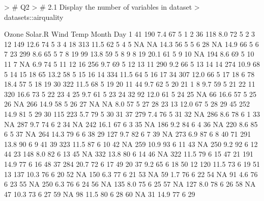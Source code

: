\documentclass{article}
\begin{document}
\begin{Schunk}
\begin{Sinput}
> # Q2
> # 2.1 Display the number of variables in dataset
> datasets::airquality
\end{Sinput}
\begin{Soutput}
    Ozone Solar.R Wind Temp Month Day
1      41     190  7.4   67     5   1
2      36     118  8.0   72     5   2
3      12     149 12.6   74     5   3
4      18     313 11.5   62     5   4
5      NA      NA 14.3   56     5   5
6      28      NA 14.9   66     5   6
7      23     299  8.6   65     5   7
8      19      99 13.8   59     5   8
9       8      19 20.1   61     5   9
10     NA     194  8.6   69     5  10
11      7      NA  6.9   74     5  11
12     16     256  9.7   69     5  12
13     11     290  9.2   66     5  13
14     14     274 10.9   68     5  14
15     18      65 13.2   58     5  15
16     14     334 11.5   64     5  16
17     34     307 12.0   66     5  17
18      6      78 18.4   57     5  18
19     30     322 11.5   68     5  19
20     11      44  9.7   62     5  20
21      1       8  9.7   59     5  21
22     11     320 16.6   73     5  22
23      4      25  9.7   61     5  23
24     32      92 12.0   61     5  24
25     NA      66 16.6   57     5  25
26     NA     266 14.9   58     5  26
27     NA      NA  8.0   57     5  27
28     23      13 12.0   67     5  28
29     45     252 14.9   81     5  29
30    115     223  5.7   79     5  30
31     37     279  7.4   76     5  31
32     NA     286  8.6   78     6   1
33     NA     287  9.7   74     6   2
34     NA     242 16.1   67     6   3
35     NA     186  9.2   84     6   4
36     NA     220  8.6   85     6   5
37     NA     264 14.3   79     6   6
38     29     127  9.7   82     6   7
39     NA     273  6.9   87     6   8
40     71     291 13.8   90     6   9
41     39     323 11.5   87     6  10
42     NA     259 10.9   93     6  11
43     NA     250  9.2   92     6  12
44     23     148  8.0   82     6  13
45     NA     332 13.8   80     6  14
46     NA     322 11.5   79     6  15
47     21     191 14.9   77     6  16
48     37     284 20.7   72     6  17
49     20      37  9.2   65     6  18
50     12     120 11.5   73     6  19
51     13     137 10.3   76     6  20
52     NA     150  6.3   77     6  21
53     NA      59  1.7   76     6  22
54     NA      91  4.6   76     6  23
55     NA     250  6.3   76     6  24
56     NA     135  8.0   75     6  25
57     NA     127  8.0   78     6  26
58     NA      47 10.3   73     6  27
59     NA      98 11.5   80     6  28
60     NA      31 14.9   77     6  29

\end{Soutput}
\end{Schunk}
\end{document}
